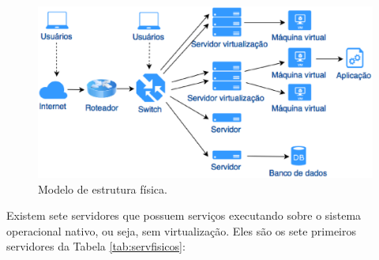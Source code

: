 \begin{figure}[h!]
 \centering
 \includegraphics[width=430px]{img/servfisicos.eps}
 \caption{Modelo de estrutura física.}
 \label{fig:servfisicos}
\end{figure}

Existem sete servidores que possuem serviços executando sobre o sistema operacional nativo, ou seja, sem virtualização. Eles são os sete 
primeiros servidores da Tabela \ref{tab:servfisicos}:
